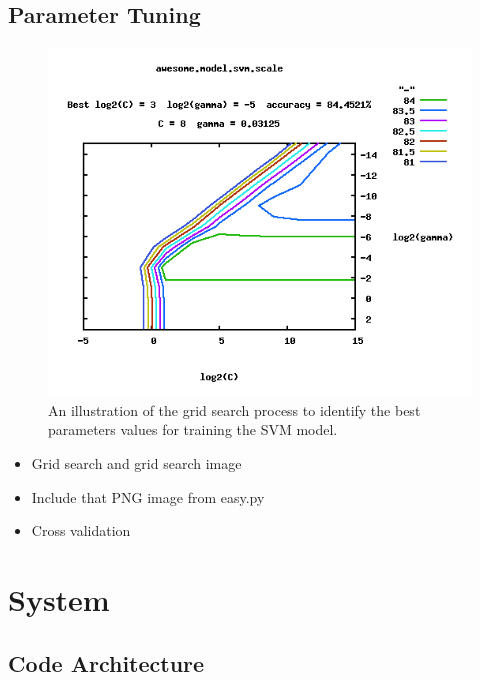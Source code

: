 \documentclass[preprint]{style}
\begin{document}
\subsection{Parameter Tuning}

\begin{figure}
\begin{center}
	\includegraphics[width=1\columnwidth]{figures/parameter-selection.png}
\end{center}
\caption{An illustration of the grid search process to identify the best parameters values for training the SVM model.}
\label{fig:parameter_selection}
\end{figure}

\begin{itemize}

\item Grid search and grid search image

\item Include that PNG image from easy.py

\item Cross validation

\end{itemize}




\section{System}

\subsection{Code Architecture}
\end{document}
